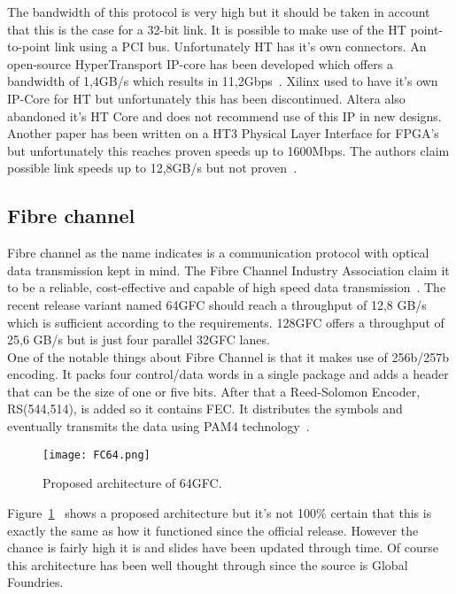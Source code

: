 	The bandwidth of this protocol is very high but it should be taken in account that this is the case for a 32-bit link. It is possible to make use of the HT point-to-point link using a PCI bus.
	Unfortunately HT has it's own connectors.
	An open-source HyperTransport IP-core has been developed which offers a bandwidth of 1,4GB/s which results in 11,2Gbps~\cite{HTIP}.
	Xilinx used to have it's own IP-Core for HT but unfortunately this has been discontinued. Altera also abandoned it's HT Core and does not recommend use of this IP in new designs. Another paper has been written on a HT3 Physical Layer Interface for FPGA's but unfortunately this reaches proven speeds up to 1600Mbps. The authors claim possible link speeds up to 12,8GB/s but not proven~\cite{HT3IP}.


\subsection{Fibre channel}
	Fibre channel as the name indicates is a communication protocol with optical data transmission kept in mind. The Fibre Channel Industry Association claim it to be a reliable, cost-effective and capable of high speed data transmission~\cite{FC}.
	The recent release variant named 64GFC should reach a throughput of 12,8 GB/s which is sufficient according to the requirements. 128GFC offers a throughput of 25,6 GB/s but is just four parallel 32GFC lanes.\\
	One of the notable things about Fibre Channel is that it makes use of 256b/257b encoding. It packs four control/data words in a single package and adds a header that can be the size of one or five bits. After that a Reed-Solomon Encoder, RS(544,514), is added so it contains FEC. It distributes the symbols and eventually transmits the data using PAM4 technology~\cite{FC64}. \\ 
	
	\begin{figure}[H]
		\centering
		\texttt{[image: FC64.png]}	
		\caption{Proposed architecture of 64GFC. }
		\label{Fig:FibreChannel_ProposedArchitecture}
	\end{figure}
	
	Figure~\ref{Fig:FibreChannel_ProposedArchitecture}~\cite{FC64} shows a proposed architecture but it's not 100\% certain that this is exactly the same as how it functioned since the official release. However the chance is fairly high it is and slides have been updated through time. Of course this architecture has been well thought through since the source is Global Foundries.
	
